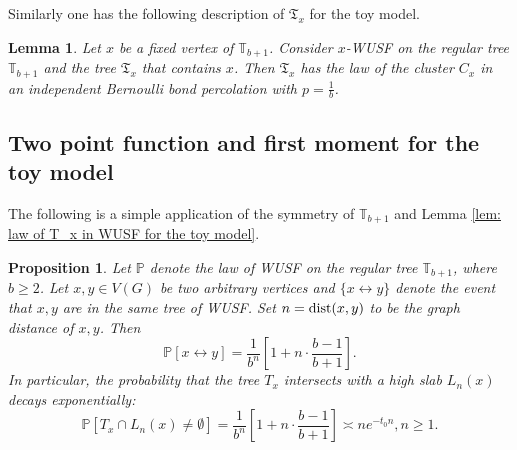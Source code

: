 \documentclass[12pt]{article}
\newtheorem{lemma}[theorem]{Lemma}
\newtheorem{proposition}[theorem]{Proposition}
\numberwithin{equation}{section}
\newcommand{\be}{\begin{equation}}
\newcommand{\ee}{\end{equation}}
\newcommand{\1}{\mathbf{1}}
\begin{document}
Similarly one has the following description of $\mathfrak{T}_x$ for the toy model. 
\begin{lemma}\label{lem: law of T_x in  x-wusf for the toy model}
	Let  $x$ be a fixed vertex of $\mathbb{T}_{b+1}$. Consider $x$-WUSF on the regular tree $\mathbb{T}_{b+1}$ and the tree $\mathfrak{T}_x$ that contains $x$. Then $\mathfrak{T}_x$ has the law of the cluster $C_x$ in an independent Bernoulli bond percolation with $p=\frac{1}{b}$.
\end{lemma}
  
\subsection{Two point function and first moment for the toy model}
 
  The following is a simple application of the symmetry of $\mathbb{T}_{b+1}$ and Lemma \ref{lem: law of T_x in WUSF for the toy model}.
 \begin{proposition}\label{prop: exact two point function for WUSF on regular trees}
 	Let $\mathbb{P}$ denote the law of WUSF on the regular tree $\mathbb{T}_{b+1}$, where $b\geq2$. Let $x,y\in V(G)$ be two arbitrary vertices and $\{x\leftrightarrow y\}$
 	denote the event that $x,y$ are in the same tree of WUSF. Set $n=\textnormal{dist}(x,y)$ to be the graph distance of $x,y$. Then 
 	\be\label{eq: two point function for WUSF on the toy model}
 	\mathbb{P}[x\leftrightarrow y]=\frac{1}{b^n}[1+n\cdot\frac{b-1}{b+1}].
 	\ee
 	In particular, the probability that the tree $T_x$ intersects with a high slab $L_n(x)$ decays exponentially: 
 	\[
 	\mathbb{P}[T_x\cap L_n(x)\neq\emptyset]=\frac{1}{b^n}[1+n\cdot\frac{b-1}{b+1}]\asymp ne^{-t_0n},n\geq1.
 	\]
 \end{proposition}
\end{document}
